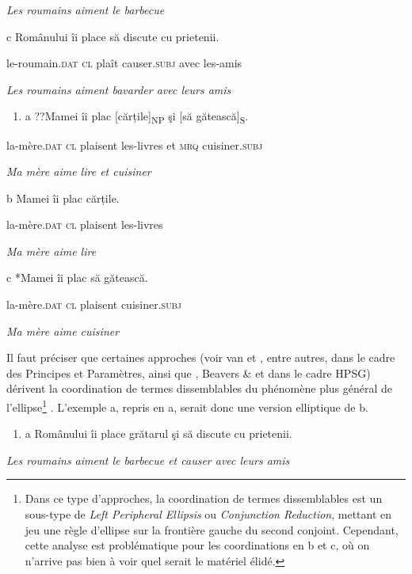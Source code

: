 {\itshape
Les roumains aiment le barbecue}

  c  Românului  îi  place  să discute  cu  prietenii.

    le-roumain\textsc{.dat  cl}  plaît  causer.\textsc{subj}  avec  les-amis

{\itshape
Les roumains aiment bavarder avec leurs amis}


\begin{enumerate}
\item \label{bkm:Ref269755045}a  ??Mamei  îi  plac  [cărțile]\textsubscript{NP}  şi  [să gătească]\textsubscript{S}.


\end{enumerate}
la-mère\textsc{.dat  cl}  plaisent  les-livres  et  \textsc{mrq} cuisiner.\textsc{subj}

{\itshape
Ma mère aime lire et cuisiner}

  b  Mamei  îi  plac  cărțile.

la-mère\textsc{.dat  cl}  plaisent  les-livres

{\itshape
    Ma mère aime lire}

  c  *Mamei  îi  plac  să gătească.

la-mère\textsc{.dat  cl}  plaisent  cuisiner.\textsc{subj}

{\itshape
    Ma mère aime cuisiner}

Il faut préciser que certaines approches (voir van \citet{Oirsouw1987} et \citet{Wilder1997}, entre autres, dans le cadre des Principes et Paramètres, ainsi que \citet{Crysmann2003}, Beavers \& \citet{Sag2004} et \citet{Chaves2007} dans le cadre HPSG) dérivent la coordination de termes dissemblables du phénomène plus général de l'ellipse\footnote{Dans ce type d'approches, la coordination de termes dissemblables est un sous-type de \textit{Left Peripheral Ellipsis} ou \textit{Conjunction Reduction}, mettant en jeu une règle d'ellipse sur la frontière gauche du second conjoint. Cependant, cette analyse est problématique pour les coordinations en b et c, où on n'arrive pas bien à voir quel serait le matériel élidé.} . L'exemple a, repris en a, serait donc une version elliptique de b. 


\begin{enumerate}
\item \label{bkm:Ref272339508}a  Românului îi place grătarul şi să discute cu prietenii.


\end{enumerate}
{\itshape
Les roumains aiment le barbecue et causer avec leurs amis}

